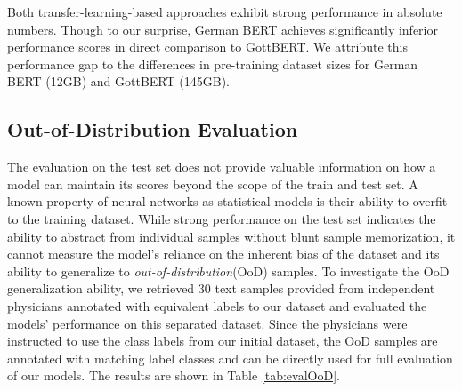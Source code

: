 \documentclass[runningheads]{llncs}
\begin{document}
Both transfer-learning-based approaches exhibit strong performance in absolute numbers. Though to our surprise, German BERT achieves significantly inferior performance scores in direct comparison to GottBERT. We attribute this performance gap to the differences in pre-training dataset sizes for German BERT (12GB) and GottBERT (145GB).

\subsection{Out-of-Distribution Evaluation}
The evaluation on the test set does not provide valuable information on how a model can maintain its scores beyond the scope of the train and test set. A known property of neural networks as statistical models is their ability to overfit to the training dataset. While strong performance on the test set indicates the ability to abstract from individual samples without blunt sample memorization, it cannot measure the model's reliance on the inherent bias of the dataset and its ability to generalize to \textit{out-of-distribution}(OoD) samples. To investigate the OoD generalization ability, we retrieved 30 text samples provided from independent physicians annotated with equivalent labels to our dataset and evaluated the models' performance on this separated dataset. Since the physicians were instructed to use the class labels from our initial dataset, the OoD samples are annotated with matching label classes and can be directly used for full evaluation of our models. The results are shown in Table \ref{tab:evalOoD}.
\end{document}
